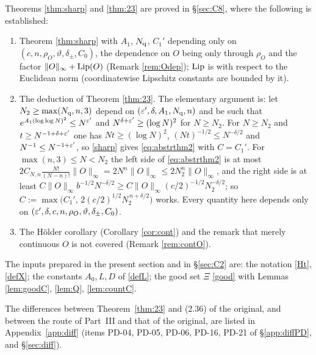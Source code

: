 \begin{auxremark}\label{c1:oblig}
Theorems \ref{thm:sharp} and \ref{thm:23} are proved in \S\ref{sec:C8}, where the following is established:
\begin{enumerate}[label=(O\arabic*),leftmargin=2.4em,itemsep=1pt]
\item Theorem \ref{thm:sharp} with $A_1$, $N_{\rm q}$, $C_1'$ depending only on $(c,n,\rho_O,\vartheta,\delta_\pm,C_0)$, the dependence on $O$ being only through $\rho_O$ and the factor $\|O\|_\infty+\operatorname{Lip}(O)$ (Remark \ref{rem:Odep}); $\operatorname{Lip}$ is with respect to the Euclidean norm (coordinatewise Lipschitz constants are bounded by it).
\item The deduction of Theorem \ref{thm:23}. The elementary argument is: let $N_2\ge\max(N_{\rm q},n,3)$ depend on $(\varepsilon',\delta,A_1,N_{\rm q},n)$ and be such that $e^{A_1(\log\log N)^2}\le N^{\varepsilon'}$ and $N^{\delta+\varepsilon'}\ge(\log N)^2$ for $N\ge N_2$.
For $N\ge N_2$ and $t\ge N^{-1+\delta+\varepsilon'}$ one has $Nt\ge(\log N)^2$, $(Nt)^{-1/2}\le N^{-\delta/2}$ and $N^{-1}\le N^{-1+\varepsilon'}$, so \eqref{sharp} gives \eqref{eq:abstrthm2} with $C=C_1'$.
For $\max(n,3)\le N<N_2$ the left side of \eqref{eq:abstrthm2} is at most $2C_{N,n}\frac{N!}{(N-n)!}\|O\|_\infty=2N^n\|O\|_\infty\le2N_2^n\|O\|_\infty$, and the right side is at least $C\|O\|_\infty b^{-1/2}N^{-\delta/2}\ge C\|O\|_\infty(c/2)^{-1/2}N_2^{-\delta/2}$;
so $C:=\max\big(C_1',\,2(c/2)^{1/2}N_2^{\,n+\delta/2}\big)$ works. Every quantity here depends only on $(\varepsilon',\delta,c,n,\rho_O,\vartheta,\delta_\pm,C_0)$.
\item The H\"older corollary (Corollary \ref{cor:cont}) and the remark that merely continuous $O$ is not covered (Remark \ref{rem:contO}).
\end{enumerate}
The inputs prepared in the present section and in \S\ref{sec:C2} are: the notation \eqref{Ht}, \eqref{defX}; the constants $A_0,L,D$ of \eqref{defL}; the good set $\Xi$ \eqref{good} with Lemmas \ref{lem:goodC}, \ref{lem:Q}, \ref{lem:countC}.
\end{auxremark}

\begin{remark}\label{rem:diff}
The differences between Theorem~\ref{thm:23} and (2.36) of the original, and between the route of Part~III and that of the original, are listed in Appendix~\ref{app:diff}
(items PD-04, PD-05, PD-06, PD-16, PD-21 of \S\ref{app:diffPD}, and \S\ref{sec:diff}).
\end{remark}

